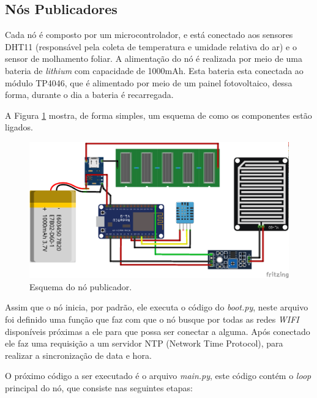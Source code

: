 \subsection{Nós Publicadores}
Cada nó é composto por um microcontrolador, e está conectado aos sensores DHT11 (responsável pela coleta de temperatura e umidade relativa do ar) e o sensor de molhamento foliar. A alimentação do nó é realizada por meio de uma bateria de \textit{lithium} com capacidade de 1000mAh. Esta bateria esta conectada ao módulo TP4046, que é alimentado por meio de um painel fotovoltaico, dessa forma, durante o dia a bateria é recarregada.

A Figura \ref{fig:no-publicador} mostra, de forma simples, um esquema de como os componentes estão ligados.

\begin{figure}[H]
    \centering
    \includegraphics[scale=0.8]{04-figuras/publisher_node.png}
    \caption{Esquema do nó publicador.}
    \vspace{-\baselineskip}
    \label{fig:no-publicador}
\end{figure}

Assim que o nó inicia, por padrão, ele executa o código do \textit{boot.py}, neste arquivo foi definido uma função que faz com que o nó busque por todas as redes \textit{WIFI} disponíveis próximas a ele para que possa ser conectar a alguma. Após conectado ele faz uma requisição a um servidor NTP (Network Time Protocol), para realizar a sincronização de data e hora.

O próximo código a ser executado é o arquivo \textit{main.py}, este código contém o \textit{loop} principal do nó, que consiste nas seguintes etapas:

